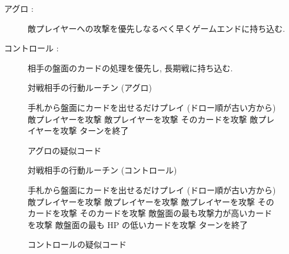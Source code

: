 \documentclass[12pt]{jarticle}
\begin{document}
\begin{description}
  \item[アグロ :]  敵プレイヤーへの攻撃を優先しなるべく早くゲームエンドに持ち込む. 
  \item[コントロール :]  相手の盤面のカードの処理を優先し, 長期戦に持ち込む.
\end{description}

\begin{figure}[t]
  \vspace{-0.3cm}
  \begin{algorithm}[H]
    \small
      \caption{
        対戦相手の行動ルーチン (アグロ)
        }
      
      \begin{algorithmic}[1] 
      \STATE 手札から盤面にカードを出せるだけプレイ (ドロー順が古い方から)
      \STATE 敵プレイヤーを攻撃
      \ELSE
      \STATE 敵プレイヤーを攻撃
      \ELSE
      \STATE そのカードを攻撃
      \ELSE
      \STATE 敵プレイヤーを攻撃
      \ENDIF
      \ENDIF
      \ENDIF
      \ENDFOR
      \STATE ターンを終了
      \end{algorithmic}
  \end{algorithm}
  \caption{アグロの疑似コード}
  \label{alg_aggro}
  \end{figure}

  \begin{figure}[t]
    \vspace{-0.3cm}
    \begin{algorithm}[H]
      \small
        \caption{
          対戦相手の行動ルーチン (コントロール)
          }
        \begin{algorithmic}[1] 
        \STATE 手札から盤面にカードを出せるだけプレイ (ドロー順が古い方から)
        \STATE 敵プレイヤーを攻撃
        \ELSE
        \STATE 敵プレイヤーを攻撃
        \ENDIF
        \STATE 敵プレイヤーを攻撃
        \ENDIF
        \STATE そのカードを攻撃
        \ENDIF
        \STATE そのカードを攻撃
        \ELSE
        \STATE 敵盤面の最も攻撃力が高いカードを攻撃
        \ELSE
        \STATE 敵盤面の最も HP の低いカードを攻撃
        \ENDIF
        \ENDIF
        \ENDIF
        \ENDFOR
        \STATE ターンを終了
        \end{algorithmic}
    \end{algorithm}
    \caption{コントロールの疑似コード}
    \label{alg_controll}
    \end{figure}
\end{document}
